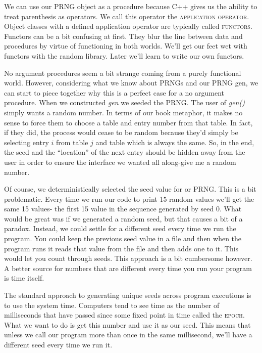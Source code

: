 \documentclass[]{tufte-handout}
\begin{document}
We can use our PRNG object as a procedure because C++ gives us the ability to treat parenthesis as operators. We call this operator the \textsc{application operator}.  Object classes with a defined application operator are typically called \textsc{functors}. Functors can be a bit confusing at first. They blur the line between data and procedures by virtue of functioning in both worlds. We'll get our feet wet with functors with the random library. Later we'll learn to write our own functors.

No argument procedures seem a bit strange coming from a purely functional world. However, considering what we know about PRNGs and our PRNG gen, we can start to piece together why this is a perfect case for a no argument procedure. When we constructed \textit{gen} we seeded the PRNG.  The user of \textit{gen()} simply wants a random number. In terms of our book metaphor, it makes no sense to force them to choose a table and entry number from that table. In fact, if they did, the process would cease to be random because they'd simply be selecting entry $i$ from table $j$ and table which is always the same.  So, in the end, the seed and the ``location'' of the next entry should be hidden away from the user in order to ensure the interface we wanted all along-give me a random number.

Of course, we deterministically selected the seed value for or PRNG.  This is a bit problematic. Every time we run our code to print 15 random values we'll get the same 15 values- the first 15 value in the sequence generated by seed 0. What would be great was if we generated a random seed, but that causes a bit of a paradox. Instead, we could settle for a different seed every time we run the program. You could keep the previous seed value in a file and then when the program runs it reads that value from the file and then adds one to it. This would let you count through seeds. This approach is a bit cumbersome however. A better source for numbers that are different every time you run your program is time itself.

The standard approach to generating unique seeds across program executions is to use the system time. Computers tend to see time as the number of milliseconds that have passed since some fixed point in time called the \textsc{epoch}.  What we want to do is get this number and use it as our seed. This means that unless we call our program more than once in the same millisecond, we'll have a different seed every time we run it.
\end{document}
